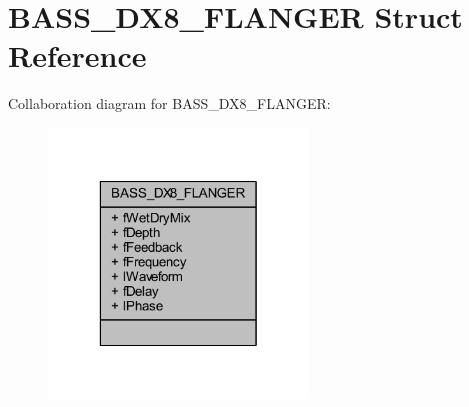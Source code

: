 \hypertarget{struct_b_a_s_s___d_x8___f_l_a_n_g_e_r}{\section{B\-A\-S\-S\-\_\-\-D\-X8\-\_\-\-F\-L\-A\-N\-G\-E\-R Struct Reference}
\label{struct_b_a_s_s___d_x8___f_l_a_n_g_e_r}
}


Collaboration diagram for B\-A\-S\-S\-\_\-\-D\-X8\-\_\-\-F\-L\-A\-N\-G\-E\-R\-:\nopagebreak
\begin{figure}[H]
\begin{center}
\leavevmode
\includegraphics[width=196pt]{struct_b_a_s_s___d_x8___f_l_a_n_g_e_r__coll__graph}
\end{center}
\end{figure}

